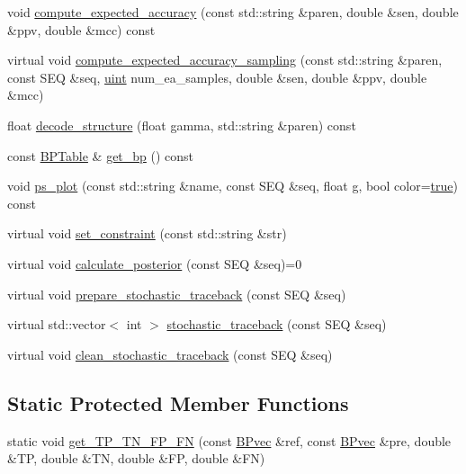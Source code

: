 \begin{DoxyCompactItemize}
\item 
void \hyperlink{class_folding_engine_a4e5f3dde4398e3ad2b9f014d5254e3dd}{compute\+\_\+expected\+\_\+accuracy} (const std\+::string \&paren, double \&sen, double \&ppv, double \&mcc) const 
\item 
virtual void \hyperlink{class_folding_engine_ae6cbbe3009c8ff7dae235ca98ccb18c2}{compute\+\_\+expected\+\_\+accuracy\+\_\+sampling} (const std\+::string \&paren, const S\+E\+Q \&seq, \hyperlink{cyktable_8h_a91ad9478d81a7aaf2593e8d9c3d06a14}{uint} num\+\_\+ea\+\_\+samples, double \&sen, double \&ppv, double \&mcc)
\item 
float \hyperlink{class_folding_engine_a54a44538dec848ce74ef84e162cb885b}{decode\+\_\+structure} (float gamma, std\+::string \&paren) const 
\item 
const \hyperlink{folding__engine_8h_a065821fb17bbd8df315f2435c973e3c1}{B\+P\+Table} \& \hyperlink{class_folding_engine_ab704de409c6dd7a674bf624335e68cc1}{get\+\_\+bp} () const 
\item 
void \hyperlink{class_folding_engine_ad7357925081147af2582df825ac42425}{ps\+\_\+plot} (const std\+::string \&name, const S\+E\+Q \&seq, float g, bool color=\hyperlink{naview_8c_a41f9c5fb8b08eb5dc3edce4dcb37fee7}{true}) const 
\item 
virtual void \hyperlink{class_folding_engine_aa979adbd342b75eb947927e6ff7bcb8c}{set\+\_\+constraint} (const std\+::string \&str)
\item 
virtual void \hyperlink{class_folding_engine_a314c78e5fe35d5a1b5f441604c58e8f1}{calculate\+\_\+posterior} (const S\+E\+Q \&seq)=0
\item 
virtual void \hyperlink{class_folding_engine_a22db64fbf81030b83316c7ca12431ee4}{prepare\+\_\+stochastic\+\_\+traceback} (const S\+E\+Q \&seq)
\item 
virtual std\+::vector$<$ int $>$ \hyperlink{class_folding_engine_a1e4bc1f100ea5bf8d957a1b20139e6f1}{stochastic\+\_\+traceback} (const S\+E\+Q \&seq)
\item 
virtual void \hyperlink{class_folding_engine_a15027401822de5e57efbf131c214c2c7}{clean\+\_\+stochastic\+\_\+traceback} (const S\+E\+Q \&seq)
\end{DoxyCompactItemize}
\subsection*{Static Protected Member Functions}
\begin{DoxyCompactItemize}
\item 
static void \hyperlink{class_folding_engine_af5d717e06dbd56b724f4c77292d533b0}{get\+\_\+\+T\+P\+\_\+\+T\+N\+\_\+\+F\+P\+\_\+\+F\+N} (const \hyperlink{folding__engine_8h_acbc65f98baf8c83dfb372fe16181981d}{B\+Pvec} \&ref, const \hyperlink{folding__engine_8h_acbc65f98baf8c83dfb372fe16181981d}{B\+Pvec} \&pre, double \&T\+P, double \&T\+N, double \&F\+P, double \&F\+N)
\end{DoxyCompactItemize}
